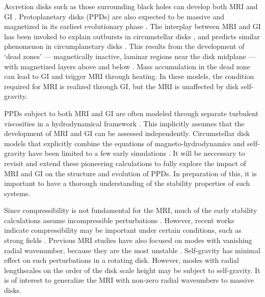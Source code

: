 \documentclass[iop]{emulateapj}
\begin{document}
Accretion disks such as those surrounding black holes can develop both
MRI and GI \citep{menou01,goodman03}.  
Protoplanetary disks (PPDs) are also expected to be massive and  
magnetized in its earliest evolutionary phase \citep{inutsuka10}.  
The interplay between MRI and GI has been invoked to explain outbursts
in circumstellar disks \citep{armitage01, zhu10a, zhu10b,
  martin12b}, and predicts similar phenomenon in circumplanetary disks
\citep{lubow12}. This results from the development of `dead zones' 
--- magnetically inactive, laminar regions near the disk midplane --- with
magnetized layers above and below 
\citep{gammie96,martin12,landry13}. Mass accumulation in the dead zone can lead to
GI and trigger MRI through heating. In these models, the condition required
for MRI is realized through GI, but the MRI is unaffected by disk
self-gravity. 


PPDs subject to both MRI and GI are often modeled through separate
turbulent viscosities in a hydrodynamical framework 
\citep{terquem08}. This implicitly assumes that the development of MRI 
and GI can be assessed independently. 
Circumstellar disk models that explicitly combine the equations of magneto-hydrodynamics
and self-gravity have been limited to a few early simulations 
\citep{fromang04,fromang04b,fromang05}. It will be neccessary to %
revisit and extend these pioneering calculations to fully explore the
impact of MRI and GI on the structure and evolution of PPDs. In
preparation of this, it is important to have a thorough understanding
of the stability properties of such systems.  


Since compressibility is not fundamental for the MRI, much of the
early stability calculations assume incompressible perturbations
\citep{goodman94,jin96}. However, recent works indicate
compressibility may be important under certain conditions,
such as strong fields \citep{kim00, pessah05,bonanno07}.   
Previous MRI studies have also focused on modes with vanishing
radial wavenumber, because they are the most unstable
\citep{sano99,reyes01}. Self-gravity has minimal effect on such
perturbations in a rotating disk. However, modes
with radial lengthscales on the order of the disk scale height may be
subject to self-gravity. It is of interest to generalize the MRI with
non-zero radial waveumbers to massive disks. 
\end{document}
